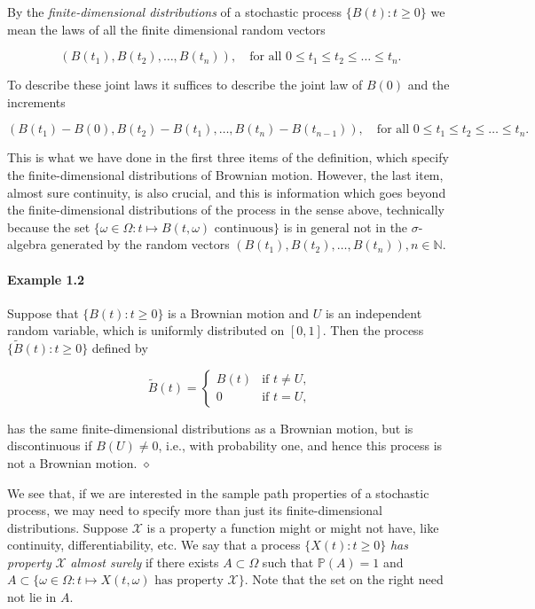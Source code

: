 \documentclass{article}
\begin{document}
By the \textit{finite-dimensional distributions} of a stochastic process $\{B(t) : t \geq 0\}$ we mean the laws of all the finite dimensional random vectors

\[
(B(t_1), B(t_2), \ldots, B(t_n)), \quad \text{for all } 0 \leq t_1 \leq t_2 \leq \ldots \leq t_n.
\]

To describe these joint laws it suffices to describe the joint law of $B(0)$ and the increments

\[
(B(t_1) - B(0), B(t_2) - B(t_1), \ldots, B(t_n) - B(t_{n-1})), \quad \text{for all } 0 \leq t_1 \leq t_2 \leq \ldots \leq t_n.
\]

This is what we have done in the first three items of the definition, which specify the finite-dimensional distributions of Brownian motion. However, the last item, almost sure continuity, is also crucial, and this is information which goes beyond the finite-dimensional distributions of the process in the sense above, technically because the set $\{\omega \in \Omega : t \mapsto B(t, \omega) \text{ continuous}\}$ is in general not in the $\sigma$-algebra generated by the random vectors $(B(t_1), B(t_2), \ldots, B(t_n)), n \in \mathbb{N}$.

\paragraph{Example 1.2} Suppose that $\{B(t) : t \geq 0\}$ is a Brownian motion and $U$ is an independent random variable, which is uniformly distributed on $[0, 1]$. Then the process $\{\tilde{B}(t) : t \geq 0\}$ defined by

\[
\tilde{B}(t) = 
\begin{cases} 
B(t) & \text{if } t \neq U, \\
0 & \text{if } t = U,
\end{cases}
\]

has the same finite-dimensional distributions as a Brownian motion, but is discontinuous if $B(U) \neq 0$, i.e., with probability one, and hence this process is not a Brownian motion. \hfill $\diamond$

We see that, if we are interested in the sample path properties of a stochastic process, we may need to specify more than just its finite-dimensional distributions. Suppose $\mathcal{X}$ is a property a function might or might not have, like continuity, differentiability, etc. We say that a process $\{X(t) : t \geq 0\}$ \textit{has property} $\mathcal{X}$ \textit{almost surely} if there exists $A \subset \Omega$ such that $\mathbb{P}(A) = 1$ and $A \subset \{\omega \in \Omega : t \mapsto X(t, \omega) \text{ has property } \mathcal{X}\}$. Note that the set on the right need not lie in $A$.
\end{document}
